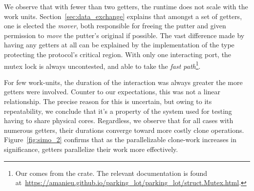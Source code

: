 We observe that with fewer than two getters, the runtime does not scale with the work units. Section~\ref{sec:data_exchange} explains that amongst a set of getters, one is elected the \textit{mover}, both responsible for freeing the putter and given permission to \textit{move} the putter's original if possible. The vast difference made by having any getters at all can be explained by the implementation of the  type protecting the protocol's critical region. With only one interacting port, the mutex lock is always uncontested, and able to take the \textit{fast path}\footnote{Our  comes from the  crate. The relevant documentation is found at~\url{https://amanieu.github.io/parking_lot/parking_lot/struct.Mutex.html}.}.

For few work-units, the duration of the interaction was always greater the more getters were involved. Counter to our expectations, this was not a linear relationship. The precise reason for this is uncertain, but owing to its repeatability, we conclude that it's a property of the system used for testing having to share physical cores. Regardless, we observe that for all cases with numerous getters, their durations converge toward more costly clone operations. Figure~\ref{fig:simo_2} confirms that as the parallelizable clone-work increases in significance, getters parallelize their work more effectively.

